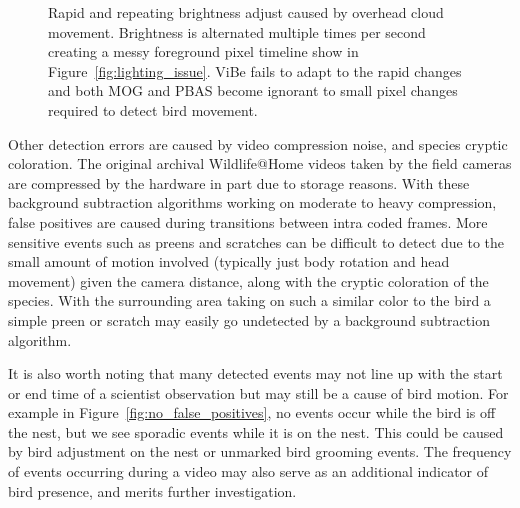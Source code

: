 \begin{sidewaysfigure}[!t]
\centering
{}
\hfil
{}
\hfil
{}
\caption{Rapid and repeating brightness adjust caused by overhead cloud movement. Brightness is alternated multiple times per second creating a messy foreground pixel timeline show in Figure~\ref{fig:lighting_issue}. ViBe fails to adapt to the rapid changes and both MOG and PBAS become ignorant to small pixel changes required to detect bird movement.}
\label{fig:lighting_example}
\end{sidewaysfigure}

Other detection errors are caused by video compression noise, and species cryptic coloration. The original archival Wildlife@Home videos taken by the field cameras are compressed by the hardware in part due to storage reasons. With these background subtraction algorithms working on moderate to heavy compression, false positives are caused during transitions between intra coded frames. More sensitive events such as preens and scratches can be difficult to detect due to the small amount of motion involved (typically just body rotation and head movement) given the camera distance, along with the cryptic coloration of the species. With the surrounding area taking on such a similar color to the bird a simple preen or scratch may easily go undetected by a background subtraction algorithm.

It is also worth noting that many detected events may not line up with the start or end time of a scientist observation but may still be a cause of bird motion. For example in Figure~\ref{fig:no_false_positives}, no events occur while the bird is off the nest, but we see sporadic events while it is on the nest. This could be caused by bird adjustment on the nest or unmarked bird grooming events. The frequency of events occurring during a video may also serve as an additional indicator of bird presence, and merits further investigation.

